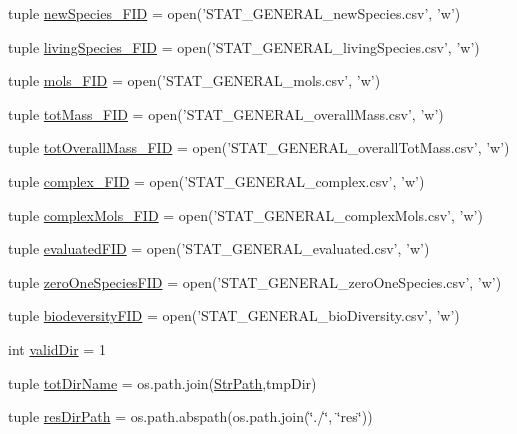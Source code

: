 \begin{DoxyCompactItemize}
\item 
tuple \hyperlink{a00104_abdb6e583333cc08cac8c63631db80b5b}{new\-Species\-\_\-\-F\-I\-D} = open('S\-T\-A\-T\-\_\-\-G\-E\-N\-E\-R\-A\-L\-\_\-new\-Species.\-csv', 'w')
\item 
tuple \hyperlink{a00104_ab7bbe9440116d34c9a373c40fc59bb3d}{living\-Species\-\_\-\-F\-I\-D} = open('S\-T\-A\-T\-\_\-\-G\-E\-N\-E\-R\-A\-L\-\_\-living\-Species.\-csv', 'w')
\item 
tuple \hyperlink{a00104_a603a41889d8732146d44da83ffaf0489}{mols\-\_\-\-F\-I\-D} = open('S\-T\-A\-T\-\_\-\-G\-E\-N\-E\-R\-A\-L\-\_\-mols.\-csv', 'w')
\item 
tuple \hyperlink{a00104_a1b7f5672822b59c7284cd2b703aacbc2}{tot\-Mass\-\_\-\-F\-I\-D} = open('S\-T\-A\-T\-\_\-\-G\-E\-N\-E\-R\-A\-L\-\_\-overall\-Mass.\-csv', 'w')
\item 
tuple \hyperlink{a00104_a20a06acdb6e82bcaab87d2781d3555a9}{tot\-Overall\-Mass\-\_\-\-F\-I\-D} = open('S\-T\-A\-T\-\_\-\-G\-E\-N\-E\-R\-A\-L\-\_\-overall\-Tot\-Mass.\-csv', 'w')
\item 
tuple \hyperlink{a00104_ace41560d233dff88c3073be734bae944}{complex\-\_\-\-F\-I\-D} = open('S\-T\-A\-T\-\_\-\-G\-E\-N\-E\-R\-A\-L\-\_\-complex.\-csv', 'w')
\item 
tuple \hyperlink{a00104_a2ef28958c50aabe7867b32f8dd6f4ace}{complex\-Mols\-\_\-\-F\-I\-D} = open('S\-T\-A\-T\-\_\-\-G\-E\-N\-E\-R\-A\-L\-\_\-complex\-Mols.\-csv', 'w')
\item 
tuple \hyperlink{a00104_a2cc9b964c81489c25978be53ab38eb16}{evaluated\-F\-I\-D} = open('S\-T\-A\-T\-\_\-\-G\-E\-N\-E\-R\-A\-L\-\_\-evaluated.\-csv', 'w')
\item 
tuple \hyperlink{a00104_a3dc90aca8a97c5995b013887c98d8ce9}{zero\-One\-Species\-F\-I\-D} = open('S\-T\-A\-T\-\_\-\-G\-E\-N\-E\-R\-A\-L\-\_\-zero\-One\-Species.\-csv', 'w')
\item 
tuple \hyperlink{a00104_a68c23cb79e89d9e14acf9ed09f46f0e4}{biodeversity\-F\-I\-D} = open('S\-T\-A\-T\-\_\-\-G\-E\-N\-E\-R\-A\-L\-\_\-bio\-Diversity.\-csv', 'w')
\item 
int \hyperlink{a00104_aebb18ab2b73e7e2705ee42c728c0a72b}{valid\-Dir} = 1
\item 
tuple \hyperlink{a00104_af4bd99f6cdaec32f48ed0074208b4f0c}{tot\-Dir\-Name} = os.\-path.\-join(\hyperlink{a00104_ac34f3f43f888eb6620266d78ce928ceb}{Str\-Path},tmp\-Dir)
\item 
tuple \hyperlink{a00104_ab3da7da39258338965b6eef645a913ee}{res\-Dir\-Path} = os.\-path.\-abspath(os.\-path.\-join(\char`\"{}./\char`\"{}, \char`\"{}res\char`\"{}))

\end{DoxyCompactItemize}
